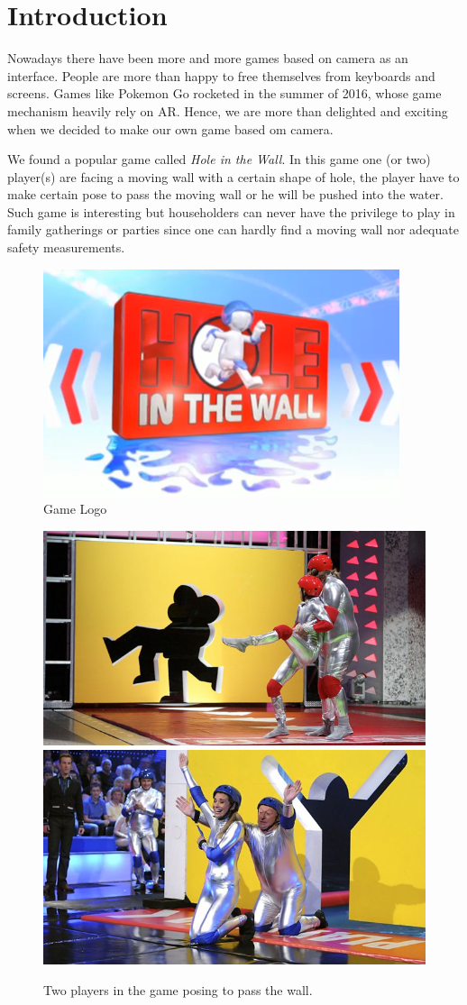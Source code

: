 \documentclass[conference,compsoc]{IEEEtran}
\begin{document}
\section{Introduction}
	\par
		Nowadays there have been more and more games based on camera as an interface.
		People are more than happy to free themselves from keyboards and screens.
		Games like Pokemon Go rocketed in the summer of 2016, whose game mechanism heavily rely on AR.
		Hence, we are more than delighted and exciting when we decided to make our own game based om camera.
	\par
		We found a popular game called \textit{Hole in the Wall}. In this game one (or two) player(s) are facing a moving wall with a certain shape of hole, the player have to make certain pose to pass the moving wall or he will be pushed into the water.
		Such game is interesting but householders can never have the privilege to play in family gatherings or parties since one can hardly find a moving wall nor adequate safety measurements.
		\begin{figure}[h]
			\centering
			\includegraphics[width=0.8\linewidth]{./Pic/HIW_Logo}
			\caption{Game Logo}
		\end{figure}
		\begin{figure}[h]
			\centering
			\includegraphics[width=0.45\linewidth]{./Pic/HIW_RedTeam}
			\includegraphics[width=0.45\linewidth]{./Pic/HIW_BlueTeam}
			\caption{Two players in the game posing to pass the wall.}
		\end{figure}
	\par
\end{document}
